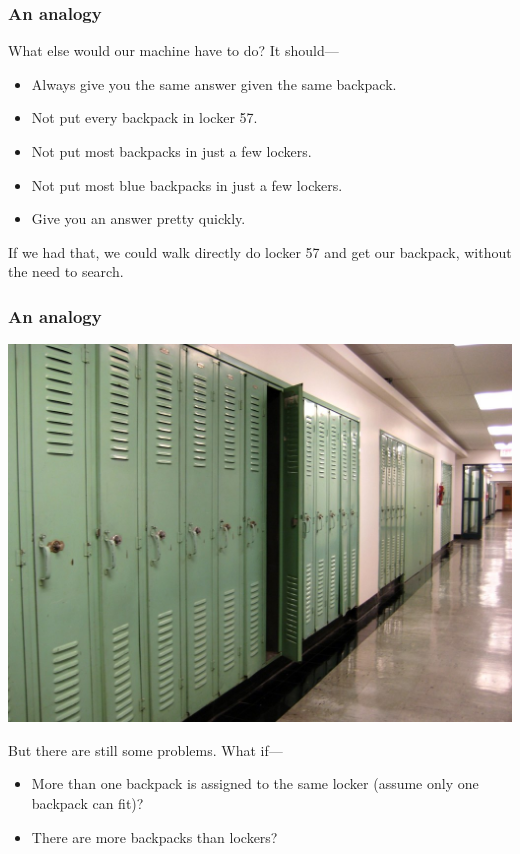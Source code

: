 \documentclass{beamer}
\begin{document}
\begin{frame}
    \frametitle{An analogy}

    What else would our machine have to do? It should---

    \begin{itemize}
        \item Always give you the same answer given the same backpack.
        \item Not put every backpack in locker 57.
        \item Not put most backpacks in just a few lockers.
        \item Not put most blue backpacks in just a few lockers.
        \item Give you an answer pretty quickly.
    \end{itemize}

    \vspace{1em}

    If we had that, we could walk directly do locker 57 and get our backpack,
    without the need to search.
\end{frame}

\begin{frame}
    \frametitle{An analogy}
    \begin{center}
        \includegraphics[width=0.5\textheight]{lockers.jpg}
    \end{center}

    But there are still some problems. What if---

    \begin{itemize}
        \item More than one backpack is assigned to the same locker (assume
              only one backpack can fit)?
        \item There are more backpacks than lockers?
    \end{itemize}
\end{frame}
\end{document}
